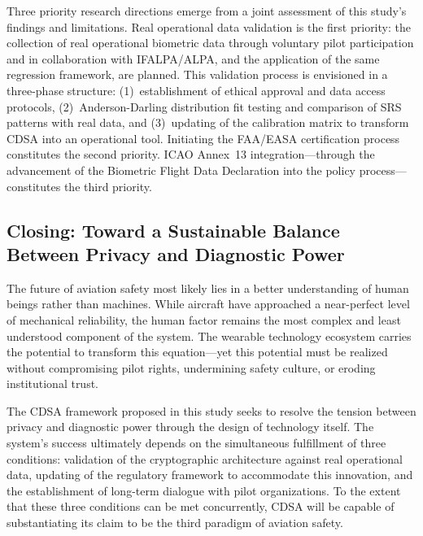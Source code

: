 \documentclass[12pt,a4paper]{article}
\begin{document}
Three priority research directions emerge from a joint assessment of this study's findings and
limitations. Real operational data validation is the first priority: the collection of real
operational biometric data through voluntary pilot participation and in collaboration with
IFALPA/ALPA, and the application of the same regression framework, are planned. This validation
process is envisioned in a three-phase structure: (1)~establishment of ethical approval and data
access protocols, (2)~Anderson-Darling distribution fit testing and comparison of SRS patterns
with real data, and (3)~updating of the calibration matrix to transform CDSA into an operational
tool. Initiating the FAA/EASA certification process constitutes the second priority. ICAO
Annex~13 integration---through the advancement of the Biometric Flight Data Declaration into the
policy process---constitutes the third priority.

\subsection{Closing: Toward a Sustainable Balance Between Privacy and Diagnostic Power}

The future of aviation safety most likely lies in a better understanding of human beings rather
than machines. While aircraft have approached a near-perfect level of mechanical reliability,
the human factor remains the most complex and least understood component of the system. The
wearable technology ecosystem carries the potential to transform this equation---yet this
potential must be realized without compromising pilot rights, undermining safety culture, or
eroding institutional trust.

The CDSA framework proposed in this study seeks to resolve the tension between privacy and
diagnostic power through the design of technology itself. The system's success ultimately depends
on the simultaneous fulfillment of three conditions: validation of the cryptographic architecture
against real operational data, updating of the regulatory framework to accommodate this innovation,
and the establishment of long-term dialogue with pilot organizations. To the extent that these
three conditions can be met concurrently, CDSA will be capable of substantiating its claim to be
the third paradigm of aviation safety.



\end{document}
